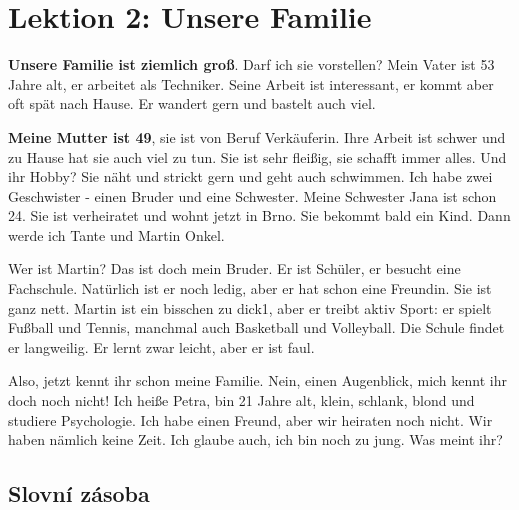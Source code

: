 \chapter{Lektion 2: Unsere Familie}\label{NJ:chap_N1_L2}

    \textbf{Unsere Familie ist ziemlich groß}. Darf ich sie vorstellen? Mein Vater ist 53 
    Jahre 
    alt, er arbeitet als Techniker. Seine Arbeit ist interessant, er kommt aber oft spät nach 
    Hause. Er wandert gern und bastelt auch viel.
    
    \textbf{Meine Mutter ist 49}, sie ist von Beruf Verkäuferin. Ihre Arbeit ist schwer und zu 
    Hause hat sie auch viel zu tun. Sie ist sehr fleißig, sie schafft immer alles. Und ihr Hobby? 
    Sie näht und strickt gern und geht auch schwimmen. Ich habe zwei Geschwister - einen Bruder und 
    eine Schwester. Meine Schwester Jana ist schon 24.  Sie ist verheiratet und wohnt jetzt in 
    Brno. Sie bekommt bald ein Kind. Dann werde ich Tante und Martin Onkel.
    
    Wer ist Martin? Das ist doch mein Bruder. Er ist Schüler, er besucht eine Fachschule.   
    Natürlich ist er noch ledig, aber er hat schon eine Freundin. Sie ist ganz nett. Martin ist ein 
    bisschen zu dick1, aber er treibt aktiv Sport: er spielt Fußball und Tennis, manchmal auch 
    Basketball und Volleyball. Die Schule findet er langweilig. Er lernt zwar leicht, aber er ist 
    faul.
    
    Also, jetzt kennt ihr schon meine Familie. Nein, einen Augenblick, mich kennt ihr doch noch 
    nicht! Ich heiße Petra, bin 21 Jahre alt, klein, schlank, blond und studiere Psychologie.    
    Ich habe einen Freund, aber wir heiraten noch nicht. Wir haben nämlich keine Zeit. Ich glaube 
    auch, ich bin noch zu jung. Was meint ihr?

  \section*{Slovní zásoba}

